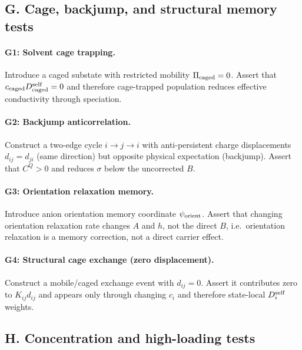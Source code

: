 \documentclass[11pt]{article}
\begin{document}
\subsection{G. Cage, backjump, and structural memory tests}

\paragraph{G1: Solvent cage trapping.}
Introduce a caged substate with restricted mobility \(\Pi_{\rm caged}=0\).
Assert that \(c_{\rm caged}D_{\rm caged}^{\rm self}=0\) and therefore
cage-trapped population reduces effective conductivity through speciation.

\paragraph{G2: Backjump anticorrelation.}
Construct a two-edge cycle \(i\to j\to i\) with anti-persistent charge
displacements \(d_{ij}=d_{ji}\) (same direction) but opposite physical
expectation (backjump). Assert that \(C^Q>0\) and reduces \(\sigma\)
below the uncorrected \(B\).

\paragraph{G3: Orientation relaxation memory.}
Introduce anion orientation memory coordinate \(\psi_{\rm orient}\).
Assert that changing orientation relaxation rate changes \(A\) and \(h\),
not the direct \(B\), i.e.\ orientation relaxation is a memory correction,
not a direct carrier effect.

\paragraph{G4: Structural cage exchange (zero displacement).}
Construct a mobile/caged exchange event with \(d_{ij}=0\). Assert it
contributes zero to \(K_{ij}d_{ij}\) and appears only through changing
\(c_i\) and therefore state-local \(D_i^{\rm self}\) weights.

\subsection{H. Concentration and high-loading tests}
\end{document}
